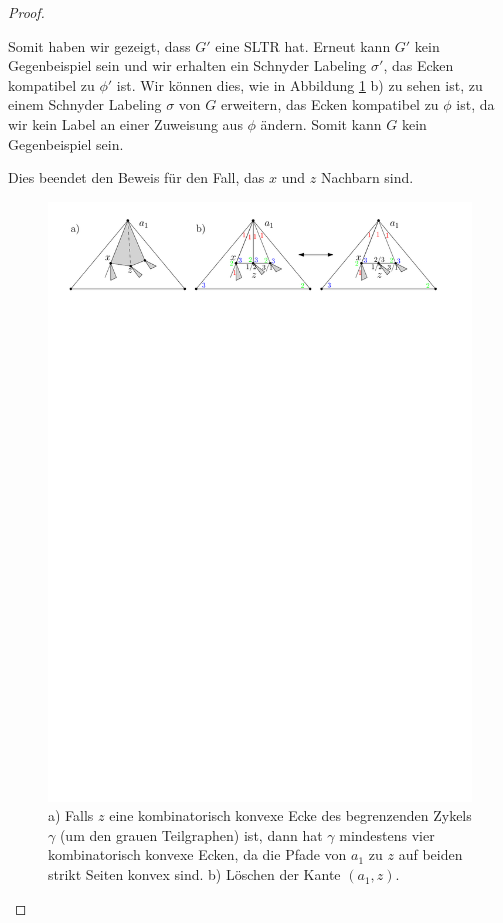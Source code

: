 \begin{proof}
\begin{description}[leftmargin =0pt, font = \rmfamily ,listparindent=\parindent,parsep=0pt]
Somit haben wir gezeigt, dass $G'$ eine SLTR hat. Erneut kann $G'$ kein Gegenbeispiel sein und wir erhalten ein Schnyder Labeling $\sigma'$, das Ecken kompatibel zu $\phi'$ ist. Wir können dies, wie in Abbildung \ref{pic_lem5_9} b) zu sehen ist, zu einem Schnyder Labeling $\sigma$ von $G$ erweitern, das Ecken kompatibel zu $\phi$ ist, da wir kein Label an einer Zuweisung aus $\phi$ ändern. Somit kann $G$ kein Gegenbeispiel sein.

Dies beendet den Beweis für den Fall, das $x$ und $z$ Nachbarn sind.

\begin{figure}[h]
\centering
\includegraphics[width=1\textwidth]{lem5_9.pdf}
\caption{a) Falls $z$ eine kombinatorisch konvexe Ecke des begrenzenden Zykels $\gamma$ (um den grauen Teilgraphen) ist, dann hat $\gamma$ mindestens vier kombinatorisch konvexe Ecken, da die Pfade von $a_1$ zu $z$ auf beiden strikt Seiten konvex sind. b) Löschen der Kante $(a_1,z)$. }
\label{pic_lem5_9}
\end{figure}


\end{description}
\end{proof}
